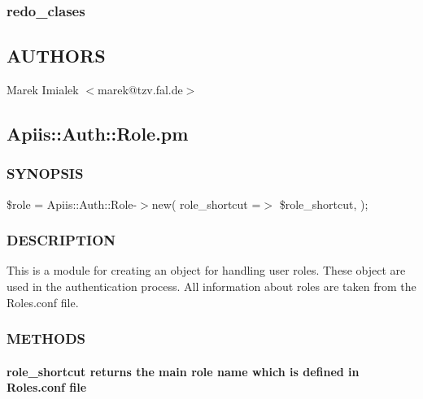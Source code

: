 \subsubsection*{redo\_clases\label{redo_clases}}
\subsection{AUTHORS\label{AUTHORS}}


Marek Imialek $<$marek@tzv.fal.de$>$

\subsection{Apiis::Auth::Role.pm\label{Apiis::Auth::Role_pm}}




\subsubsection*{SYNOPSIS\label{Apiis::Auth::Role_pm_SYNOPSIS}}


\$role = Apiis::Auth::Role-$>$new(
                                role\_shortcut =$>$ \$role\_shortcut,
                               );

\subsubsection*{DESCRIPTION\label{Apiis::Auth::Role_pm_DESCRIPTION}}


This is a module for creating an object for handling user roles. These object are used in the authentication process.
All information about roles are taken from the Roles.conf file.

\subsubsection*{METHODS\label{Apiis::Auth::Role_pm_METHODS}}
\paragraph*{role\_shortcut
 returns the main role name  which is defined in Roles.conf  file\label{Apiis::Auth::Role_pm_role_shortcut_returns_the_main_role_name_which_is_defined_in_Roles_conf_file}}
